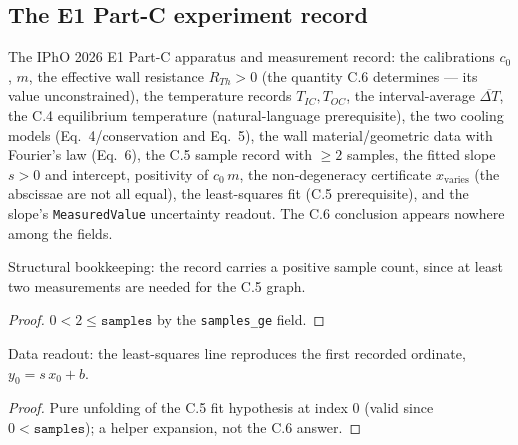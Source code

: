 \subsection*{The E1 Part-C experiment record}

\begin{definition}
\label{def:IPhO2026Problems_problem_IPhO_2026_4_C_6:ExperimentC}
The IPhO 2026 E1 Part-C apparatus and measurement record: the calibrations
$c_0$, $m$, the effective wall resistance $R_{Th} > 0$ (the quantity C.6
determines — its value unconstrained), the temperature records
$T_{IC}, T_{OC}$, the interval-average $\overline{\Delta T}$, the C.4
equilibrium temperature (natural-language prerequisite), the two cooling
models (Eq.\ 4/conservation and Eq.\ 5), the wall material/geometric data
with Fourier's law (Eq.\ 6), the C.5 sample record with $\ge 2$ samples, the
fitted slope $s > 0$ and intercept, positivity of $c_0\,m$, the
non-degeneracy certificate $x_{\mathrm{varies}}$ (the abscissae are not all
equal), the least-squares fit (C.5 prerequisite), and the slope's
\texttt{MeasuredValue} uncertainty readout. The C.6 conclusion appears
nowhere among the fields.
\end{definition}

\begin{lemma}
\label{lem:IPhO2026Problems_problem_IPhO_2026_4_C_6:samples_pos}
Structural bookkeeping: the record carries a positive sample count, since at
least two measurements are needed for the C.5 graph.
\end{lemma}
\begin{proof}
$0 < 2 \le \texttt{samples}$ by the \texttt{samples\_ge} field.
\end{proof}

\begin{lemma}
\label{lem:IPhO2026Problems_problem_IPhO_2026_4_C_6:c5_first_point}
Data readout: the least-squares line reproduces the first recorded ordinate,
$y_0 = s\,x_0 + b$.
\end{lemma}
\begin{proof}
Pure unfolding of the C.5 fit hypothesis at index $0$ (valid since
$0 < \texttt{samples}$); a helper expansion, not the C.6 answer.
\end{proof}

